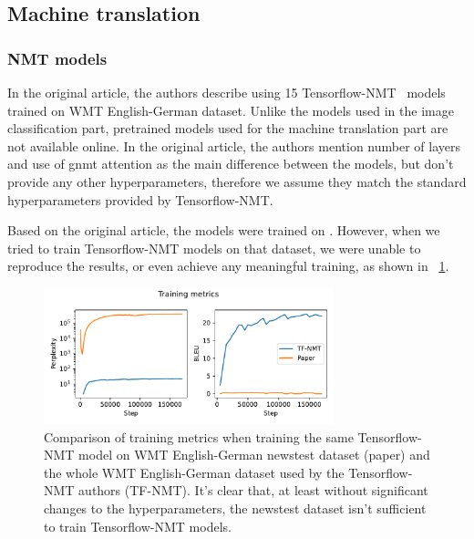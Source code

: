 \begin{figure}
	
\end{figure}

\subsection{Machine translation}

\subsubsection{NMT models} %

In the original article, the authors describe using 15 Tensorflow-NMT~\cite{luong17} models trained on WMT English-German dataset. Unlike the models used in the image classification part, pretrained models used for the machine translation part are not available online. In the original article, the authors mention number of layers and use of gnmt attention as the main difference between the models, but don't provide any other hyperparameters, therefore we assume they match the standard hyperparameters provided by Tensorflow-NMT.

Based on the original article, the models were trained on . However, when we tried to train Tensorflow-NMT models on that dataset, we were unable to reproduce the results, or even achieve any meaningful training, as shown in \figurename~\ref{fig:tf-nmt_paper_training}.

\begin{figure}[h]
	\centering
	\includegraphics[width=0.75\textwidth]{figures/tf-nmt_paper_training.pdf}
	\caption{Comparison of training metrics when training the same Tensorflow-NMT model on WMT English-German newstest dataset (paper) and the whole WMT English-German dataset used by the Tensorflow-NMT authors (TF-NMT). It's clear that, at least without significant changes to the hyperparameters, the newstest dataset isn't sufficient to train Tensorflow-NMT models.}
	\label{fig:tf-nmt_paper_training}
\end{figure}

